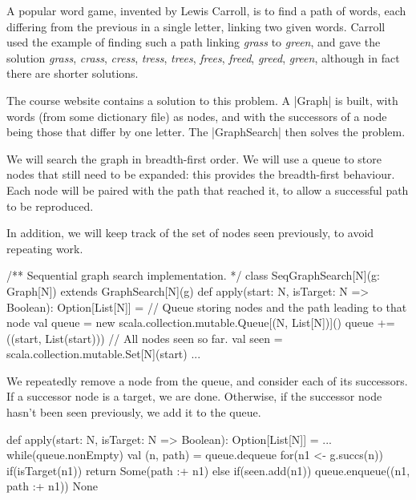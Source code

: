 \begin{slide}

\def\word#1{\emph{#1}}
A popular word game, invented by Lewis Carroll, is to find a path of words,
each differing from the previous in a single letter, linking two given words.
Carroll used the example of finding such a path linking \word{grass} to
\word{green}, and gave the solution \word{grass}, \word{crass}, \word{cress},
\word{tress}, \word{trees}, \word{frees}, \word{freed}, \word{greed},
\word{green}, although in fact there are shorter solutions.

The course website contains a solution to this problem.  A |Graph| is built,
with words (from some dictionary file) as nodes, and with the successors of a
node being those that differ by one letter.  The |GraphSearch| then solves the
problem.
\end{slide}


\begin{slide}

We will search the graph in breadth-first order.  We will use a queue to store
nodes that still need to be expanded: this provides the breadth-first
behaviour.  Each node will be paired with the path that reached it, to allow a
successful path to be reproduced.

In addition, we will keep track of the set of nodes seen previously, to avoid
repeating work.
\begin{scala}
/** Sequential graph search implementation. */
class SeqGraphSearch[N](g: Graph[N]) extends GraphSearch[N](g){
  def apply(start: N, isTarget: N => Boolean): Option[List[N]] = {
    // Queue storing nodes and the path leading to that node
    val queue = new scala.collection.mutable.Queue[(N, List[N])]()
    queue += ((start, List(start)))
    // All nodes seen so far.
    val seen = scala.collection.mutable.Set[N](start)
    ...
} }
\end{scala}
\end{slide}


\begin{slide}

We repeatedly remove a node from the queue, and consider each of its
successors.  If a successor node is a target, we are done.  Otherwise, if the
successor node hasn't been seen previously, we add it to the queue.
%
\begin{scala}
  def apply(start: N, isTarget: N => Boolean): Option[List[N]] = {
    ...
    while(queue.nonEmpty){
      val (n, path) = queue.dequeue
      for(n1 <- g.succs(n)){
        if(isTarget(n1)) return Some(path :+ n1)
        else if(seen.add(n1)) queue.enqueue((n1, path :+ n1))
      }
    }
    None
  }
\end{scala}
\end{slide}

